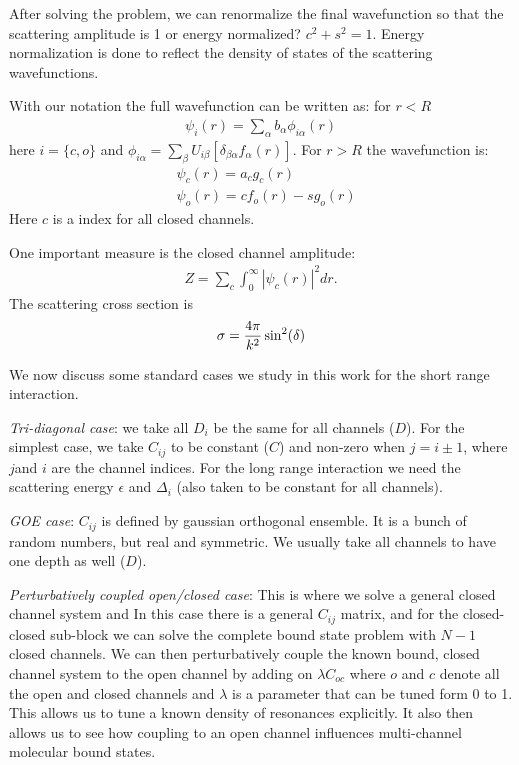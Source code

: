 \documentclass[twocolumn,showpacs,amsmath,amssymb]{revtex4}
\begin{document}
After solving the problem, we can renormalize the final wavefunction
so that the scattering amplitude is 1 or energy normalized?
$c^2+s^2=1$.
Energy normalization is done to reflect the density of states of the scattering 
wavefunctions. 

With our notation the full wavefunction can be written as: for $r<R$
\begin{eqnarray}
\psi_i(r)=\sum_\alpha b_\alpha \phi_{i\alpha}(r)
\end{eqnarray}
here $i=\{c,o\}$ and $\phi_{i\alpha}=\sum_\beta U_{i\beta}[\delta_{\beta\alpha}f_\alpha(r)]$.
For $r>R$ the wavefunction  is:
\begin{eqnarray}
&\psi_{c}(r)=a_c g_c(r)
\\\nonumber
&\psi_o(r)=c f_o(r)-s g_o(r)  
\end{eqnarray}
Here $c$ is a index for all closed channels.
 
One important measure is the closed channel amplitude:
\begin{eqnarray}
Z=\sum_c \int_0^\infty  |\psi_c(r)|^2 dr.
\end{eqnarray}
The scattering cross section is 
\begin{eqnarray}
\sigma={4 \pi \over k^2} \sin^2(\delta)
\end{eqnarray}

We now discuss some standard cases we study in this work for the 
short range interaction.

{\it Tri-diagonal case}:
we take all $D_i$ be the same for all channels ($D$).
For the simplest case, we take $C_{ij}$
to be constant ($C$) and non-zero when $j=i\pm1$,
where $j$and $i$ are the channel indices.  
For the long range interaction we need the scattering energy $\epsilon$ and $\Delta_i$ (also taken to be constant for all channels).

{\it GOE case}: $C_{ij}$ is defined by gaussian orthogonal ensemble. 
It is a bunch of random numbers, but real and symmetric.
We usually take all channels to have one depth as well ($D$). 

{\it Perturbatively coupled open/closed case}:
This is where we solve a general closed channel system and 
In this case there is a general $C_{ij}$ matrix, and for the closed-closed sub-block
we can solve the complete bound state problem with $N-1$ closed channels.
We can then perturbatively couple the known bound, closed channel system to 
the open channel by adding on $\lambda C_{oc}$ where $o$ and $c$ denote all
the open and closed channels and $\lambda$ is a parameter that can be tuned 
form 0 to 1. 
This allows us to tune a known density of resonances explicitly. 
It also then allows us to see how coupling to an open channel influences 
multi-channel molecular bound states.
\end{document}

